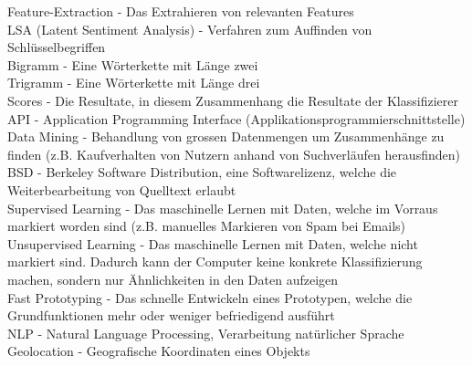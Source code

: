 Feature-Extraction - Das Extrahieren von relevanten Features\\
LSA (Latent Sentiment Analysis) - Verfahren zum Auffinden von Schlüsselbegriffen\\
Bigramm - Eine Wörterkette mit Länge zwei\\
Trigramm - Eine Wörterkette mit Länge drei\\
Scores - Die Resultate, in diesem Zusammenhang die Resultate der Klassifizierer\\
API - Application Programming Interface (Applikationsprogrammierschnittstelle)\\
Data Mining - Behandlung von grossen Datenmengen um Zusammenhänge zu finden (z.B. Kaufverhalten von Nutzern anhand von Suchverläufen herausfinden)\\
BSD - Berkeley Software Distribution, eine Softwarelizenz, welche die Weiterbearbeitung von Quelltext erlaubt\\
Supervised Learning - Das maschinelle Lernen mit Daten, welche im Vorraus markiert worden sind (z.B. manuelles Markieren von Spam bei Emails)\\
Unsupervised Learning - Das maschinelle Lernen mit Daten, welche nicht markiert sind. Dadurch kann der Computer keine konkrete Klassifizierung machen, sondern nur Ähnlichkeiten in den Daten aufzeigen\\
Fast Prototyping - Das schnelle Entwickeln eines Prototypen, welche die Grundfunktionen mehr oder weniger befriedigend ausführt\\
NLP - Natural Language Processing, Verarbeitung natürlicher Sprache\\
Geolocation - Geografische Koordinaten eines Objekts
